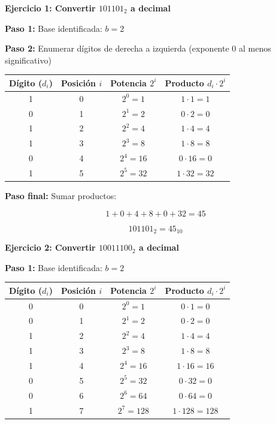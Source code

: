 \documentclass[12pt,twoside]{book}
\begin{document}
						\noindent
						\textbf{Ejercicio 1: Convertir $101101_2$ a decimal}
						
						\noindent
						\textbf{Paso 1:} Base identificada: $b=2$
						
						\noindent
						\textbf{Paso 2:} Enumerar dígitos de derecha a izquierda (exponente 0 al menos significativo)
						
						\begin{center}
							\begin{tabular}{c|c|c|c}
								Dígito ($d_i$) & Posición $i$ & Potencia $2^i$ & Producto $d_i\cdot 2^i$ \\
								\hline
								1 & 0 & $2^0=1$  & $1\cdot 1 = 1$ \\
								0 & 1 & $2^1=2$  & $0\cdot 2 = 0$ \\
								1 & 2 & $2^2=4$  & $1\cdot 4 = 4$ \\
								1 & 3 & $2^3=8$  & $1\cdot 8 = 8$ \\
								0 & 4 & $2^4=16$ & $0\cdot 16 = 0$ \\
								1 & 5 & $2^5=32$ & $1\cdot 32 = 32$ \\
							\end{tabular}
						\end{center}
						
						\noindent
						\textbf{Paso final:} Sumar productos:
						
						\[
						1 + 0 + 4 + 8 + 0 + 32 = 45
						\]
						
						\[
						101101_2 = 45_{10}
						\]
						
						\noindent
						\textbf{Ejercicio 2: Convertir $10011100_2$ a decimal}
						
						\noindent
						\textbf{Paso 1:} Base identificada: $b=2$
						
						\begin{center}
							\begin{tabular}{c|c|c|c}
								Dígito ($d_i$) & Posición $i$ & Potencia $2^i$ & Producto $d_i\cdot 2^i$ \\
								\hline
								0 & 0 & $2^0=1$   & $0\cdot 1 = 0$ \\
								0 & 1 & $2^1=2$   & $0\cdot 2 = 0$ \\
								1 & 2 & $2^2=4$   & $1\cdot 4 = 4$ \\
								1 & 3 & $2^3=8$   & $1\cdot 8 = 8$ \\
								1 & 4 & $2^4=16$  & $1\cdot 16 = 16$ \\
								0 & 5 & $2^5=32$  & $0\cdot 32 = 0$ \\
								0 & 6 & $2^6=64$  & $0\cdot 64 = 0$ \\
								1 & 7 & $2^7=128$ & $1\cdot 128 = 128$ \\
							\end{tabular}
						\end{center}
						
\end{document}
